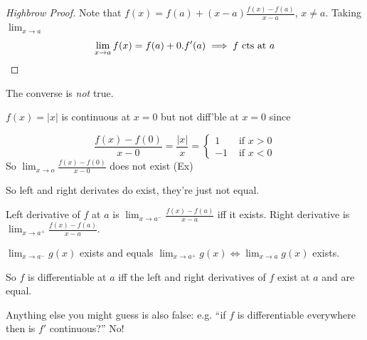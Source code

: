 \documentclass[twoside]{scrartcl}
\begin{document}
\begin{proof}[Highbrow Proof]
Note that $f(x) = f(a) + (x-a)\frac{f(x) -f(a)}{x-a}$, $x \neq a$. Taking  $\lim_{x\to a}$  \[\lim_{x\to a}f(x) = f(a) + 0.f'(a) \implies f \text{ cts at } a\qedhere\]\end{proof}

The converse is \emph{not} true.\vspace*{10pt}

\begin{example}
$f(x) = |x|$ is continuous at $x = 0$ but not diff'ble at $x = 0$ since 

\[\frac{f(x) -f(0)}{x-0} = \frac{|x|}{x} = \begin{cases}
 1 & \text{ if } x > 0\\
 -1 & \text{ if } x < 0	
 \end{cases}
\]
So $\lim_{x\to o} \frac{f(x) -f(0)}{x-0}$ does not exist (Ex)

\begin{center}
\end{center}




So left and right derivates do exist, they're just not equal. 
\end{example}\vspace*{5pt}

\begin{definition}
Left derivative of $f$ at $a$ is $\lim_{x \to a^-}\frac{f(x) -f(a)}{x-a}$ iff it exists. Right derivative is $\lim_{x \to a^+}\frac{f(x) -f(a)}{x-a}$. 

$\lim_{x \to a^-}g(x)$ exists and equals $\lim_{x \to a^+}g(x) \iff \lim_{x\to a}g(x)$ exists.
\end{definition}

So $f$ is differentiable at $a$ iff the left and right derivatives of $f$ exist at $a$ and are equal. 

Anything else you might guess is also false: e.g. ``if $f$ is differentiable everywhere then is $f'$ continuous?'' No!\vspace*{10pt}
\end{document}
